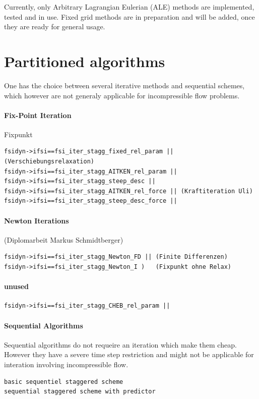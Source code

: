 Currently, only Arbitrary Lagrangian Eulerian (ALE) methods are implemented, tested and in use. Fixed grid methods are in preparation and will be added, once they are ready for general usage.


\section{Partitioned algorithms}

One has the choice between several iterative methods and sequential schemes, which however are not generaly applicable for incompressible flow problems.

\paragraph{Fix-Point Iteration}
Fixpunkt
\begin{verbatim}
fsidyn->ifsi==fsi_iter_stagg_fixed_rel_param || (Verschiebungsrelaxation)
fsidyn->ifsi==fsi_iter_stagg_AITKEN_rel_param ||
fsidyn->ifsi==fsi_iter_stagg_steep_desc ||
fsidyn->ifsi==fsi_iter_stagg_AITKEN_rel_force || (Kraftiteration Uli)
fsidyn->ifsi==fsi_iter_stagg_steep_desc_force ||
\end{verbatim}

\paragraph{Newton Iterations}
(Diplomarbeit Markus Schmidtberger)
\begin{verbatim}
fsidyn->ifsi==fsi_iter_stagg_Newton_FD || (Finite Differenzen)
fsidyn->ifsi==fsi_iter_stagg_Newton_I )   (Fixpunkt ohne Relax)
\end{verbatim}

\paragraph{unused}
\begin{verbatim}
fsidyn->ifsi==fsi_iter_stagg_CHEB_rel_param ||
\end{verbatim}

\paragraph{Sequential Algorithms}
Sequential algorithms do not requeire an iteration which make them cheap. However they have a severe time step restriction and might not be applicable for interation involving incompressible flow.
\begin{verbatim}
basic sequentiel staggered scheme
sequential staggered scheme with predictor
\end{verbatim}


